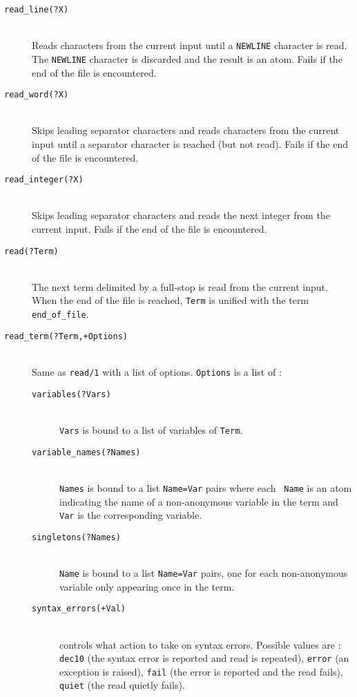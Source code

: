 \begin{description}

\item [{\tt read\_line(?X)}]~\\
	Reads characters from the current input until a {\tt NEWLINE} 
	character is read. The {\tt NEWLINE} character is discarded
	and the result is an atom. Fails if the end of the file is
	encountered.  

\item [{\tt read\_word(?X)}]~\\
	Skips leading separator characters and reads characters from the
	current input until a separator character is reached (but not
 	read). Fails if the end of the file is encountered.  

\item [{\tt read\_integer(?X)}]~\\
	Skips leading separator characters and reads the next integer
	from the current input. Fails if the end of the file is
	encountered.   

\item [{\tt read(?Term)}]~\\ 
	The next term delimited by a full-stop is read from the
	current input. When the end of the file is reached, {\tt Term}
	is unified with the term {\tt end\_of\_file}.

\item [{\tt read\_term(?Term,+Options)}]~\\ 
	Same as {\tt read/1} with a list of options. {\tt Options} is
	a list of :
	\begin{description}

	\item [{\tt variables(?Vars)}]~\\ 
	{\tt Vars} is bound to a list of variables of {\tt Term}.

	\item [{\tt variable\_names(?Names)}]~\\ 
	{\tt Names} is bound to a list {\tt Name=Var} pairs where each {\tt
	Name} is an atom indicating the name of a non-anonymous
 	variable in the term and {\tt Var} is the corresponding
	variable. 

	\item [{\tt singletons(?Names)}]~\\ 
	{\tt Name} is bound to a list {\tt Name=Var} pairs, one for
	each non-anonymous variable only appearing once in the term.

	\item [{\tt syntax\_errors(+Val)}]~\\ 
	controls what action to take on syntax errors. Possible values
	are : {\tt dec10} (the syntax error is reported and read is
	repeated), {\tt error} (an exception is raised), {\tt fail}
	(the error is reported and the read fails), {\tt quiet} (the read
	quietly fails). 


\end{description}
\end{description}
